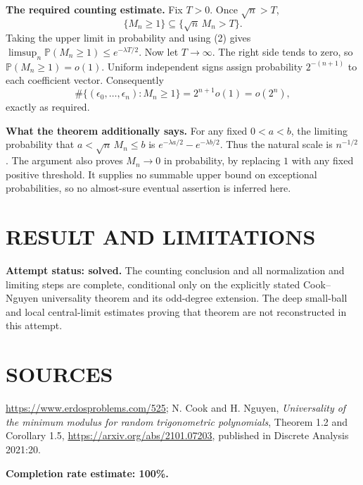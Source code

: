 \textbf{The required counting estimate.} Fix $T>0$. Once $\sqrt n>T$,
\[
 \{M_n\geq1\}\subseteq\{\sqrt n\,M_n>T\}.
\]
Taking the upper limit in probability and using (2) gives
$\limsup_n\mathbb P(M_n\geq1)\leq e^{-\lambda T/2}$.
Now let $T\to\infty$. The right side tends to zero, so $\mathbb P(M_n\geq1)=o(1)$. Uniform independent signs assign probability $2^{-(n+1)}$ to each coefficient vector. Consequently
\[
 \#\{(\epsilon_0,\ldots,\epsilon_n):M_n\geq1\}
 =2^{n+1}o(1)=o(2^n),
\]
exactly as required.

\textbf{What the theorem additionally says.} For any fixed $0<a<b$, the limiting probability that $a<\sqrt n\,M_n\leq b$ is $e^{-\lambda a/2}-e^{-\lambda b/2}$. Thus the natural scale is $n^{-1/2}$. The argument also proves $M_n\to0$ in probability, by replacing $1$ with any fixed positive threshold. It supplies no summable upper bound on exceptional probabilities, so no almost-sure eventual assertion is inferred here.

\section{RESULT AND LIMITATIONS}
\textbf{Attempt status: solved.} The counting conclusion and all normalization and limiting steps are complete, conditional only on the explicitly stated Cook--Nguyen universality theorem and its odd-degree extension. The deep small-ball and local central-limit estimates proving that theorem are not reconstructed in this attempt.

\section{SOURCES}
\url{https://www.erdosproblems.com/525}; N. Cook and H. Nguyen, \emph{Universality of the minimum modulus for random trigonometric polynomials}, Theorem 1.2 and Corollary 1.5, \url{https://arxiv.org/abs/2101.07203}, published in Discrete Analysis 2021:20.

\textbf{Completion rate estimate: 100\%.}
